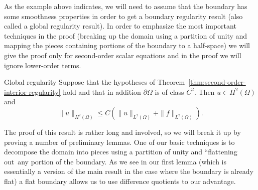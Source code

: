 As the example above indicates, we will need to assume that the boundary has some smoothness properties in order to get a boundary regularity result (also called a global regularity result). In order to emphasize the most important techniques in the proof (breaking up the domain using a partition of unity and mapping the pieces containing portions of the boundary to a half-space) we will give the proof only for second-order scalar equations and in the proof we will ignore lower-order terms.

\begin{Theorem}{Global regularity}
\label{thm:global-boundary-regularity}
Suppose that the hypotheses of Theorem~\ref{thm:second-order-interior-regularity} hold and that in addition $\partial\Omega$ is of class $C^2$. Then $u\in H^2(\Omega)$ and
\begin{equation}\label{eq:global-boundary-regularity-h2-estimate}
\|u\|_{H^2(\Omega)}\leq C(\|u\|_{L^2(\Omega)}+\|f\|_{L^2(\Omega)}).
\end{equation}

\end{Theorem}

The proof of this result is rather long and involved, so we will break it up by proving a number of preliminary lemmas. One of our basic techniques is to decompose the domain into pieces using a partition of unity and ``flattening out\textquotesingle\textquotesingle\ any portion of the boundary. As we see in our first lemma (which is essentially a version of the main result in the case where the boundary is already flat) a flat boundary allows us to use difference quotients to our advantage.

